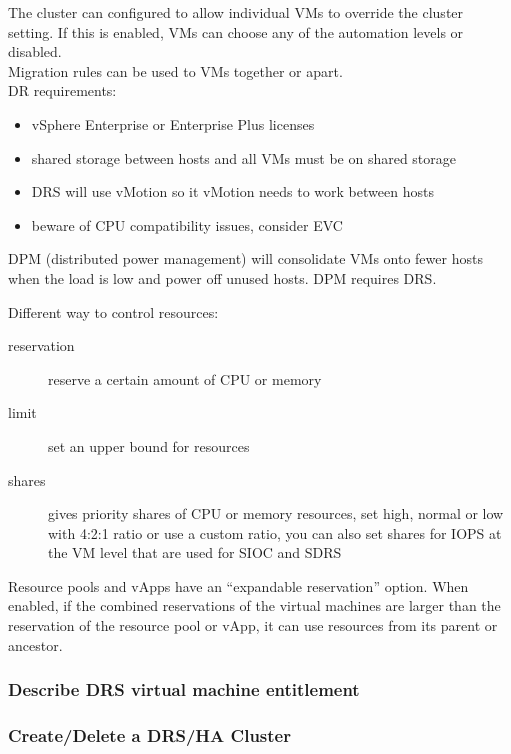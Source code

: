 The cluster can configured to allow individual VMs to override the cluster
setting. If this is enabled, VMs can choose any of the automation levels
or disabled.\\

Migration rules can be used to VMs together or apart.\\

DR requirements:

\begin{itemize}
\item vSphere Enterprise or Enterprise Plus licenses
\item shared storage between hosts and all VMs must be on shared storage
\item DRS will use vMotion so it vMotion needs to work between hosts
\item beware of CPU compatibility issues, consider EVC
\end{itemize}

DPM (distributed power management) will consolidate VMs onto fewer hosts when
the load is low and power off unused hosts. DPM requires DRS.

Different way to control resources:

\begin{description}

\item[reservation]
reserve a certain amount of CPU or memory

\item[limit]
set an upper bound for resources

\item[shares]
gives priority shares of CPU or memory resources, set high, normal or low
with 4:2:1 ratio or use a custom ratio, you can also set shares for IOPS
at the VM level that are used for SIOC and SDRS

\end{description}

Resource pools and vApps have an ``expandable reservation'' option. When
enabled, if the combined reservations of the virtual machines are larger
than the reservation of the resource pool or vApp, it can use resources from
its parent or ancestor.

\subsubsection{Describe DRS virtual machine entitlement}

\subsubsection{Create/Delete a DRS/HA Cluster}

